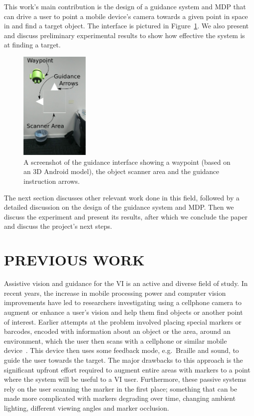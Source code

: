 \documentclass[a4paper, twoside]{article}
\begin{document}
This work's main contribution is the design of a guidance system and MDP that can drive a user to point a mobile device's camera towards a given point in space in and find a target object. The interface is pictured in Figure~\ref{fig:system-screenshot}. We also present and discuss preliminary experimental results to show how effective the system is at finding a target.

\begin{figure}
  \centering
  \includegraphics[width=0.3\textwidth]{figures/system_screenshot.png}
  \caption{A screenshot of the guidance interface showing a waypoint (based on an 3D Android model), the object scanner area and the guidance instruction arrows. }\label{fig:system-screenshot}
\end{figure}

The next section discusses other relevant work done in this field, followed by a detailed discussion on the design of the guidance system and MDP\@. Then we discuss the experiment and present its results, after which we conclude the paper and discuss the project's next steps. 

\section{\uppercase{Previous Work}}

\noindent Assistive vision and guidance for the VI is an active and diverse field of study. In recent years, the increase in mobile processing power and computer vision improvements have led to researchers investigating using a cellphone camera to augment or enhance a user's vision and help them find objects or another point of interest. Earlier attempts at the problem involved placing special markers or barcodes, encoded with information about an object or the area, around an environment, which the user then scans with a cellphone or similar mobile device~\cite{gude2013blind,iannizzotto2005badge3d,manduchi2012mobile}. This device then uses some feedback mode, e.g.\ Braille and sound, to guide the user towards the target. The major drawbacks to this approach is the significant upfront effort required to augment entire areas with markers to a point where the system will be useful to a VI user. Furthermore, these passive systems rely on the user scanning the marker in the first place; something that can be made more complicated with markers degrading over time, changing ambient lighting, different viewing angles and marker occlusion. 
\end{document}
